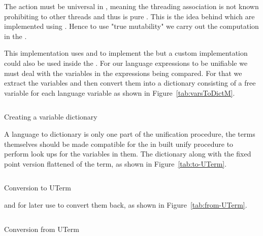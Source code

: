 \documentclass[thesis-solanki.tex]{subfiles}
\begin{document}
The action  must be universal in , meaning the threading association is not known
prohibiting to other threads and thus  is pure \cite{website:stmonadwiki,
  website:stmonadstackoverflow}.
This is the idea behind  which are implemented using .
Hence to use "true mutability" we carry out the computation in the .

This implementation uses  and  to implement the
 but a custom implementation could also be used inside the
.
For our language expressions to be unifiable we must deal with the variables in the expressions being compared.
For that we extract the variables and then convert them into a dictionary consisting of a free variable for each
language variable as shown in Figure~\ref{tab:varsToDictM}.

\begin{code-list}[H]
  \begin{singlespace}
  \inputminted[linenos]{haskell}{haskell-proto1-var-extract.hs}
  \end{singlespace}
  \caption{Creating a variable dictionary}
  \label{tab:varsToDictM}
\end{code-list}

A language to  dictionary is only one part of the unification procedure, the terms
themselves should be made compatible for the in built unify procedure to perform look ups for the variables in
them.
The dictionary along with the fixed point version flattened of the term, as shown in Figure~\ref{tab:to-UTerm}.
%
\begin{code-list}[H]
  \begin{singlespace}
  \inputminted[linenos]{haskell}{haskell-proto1-utermify-frog.hs}
  \end{singlespace}
  \caption{Conversion to UTerm}
  \label{tab:to-UTerm}
\end{code-list}
%
and for later use to convert them back, as shown in Figure~\ref{tab:from-UTerm}.
%
\begin{code-list}[H]
  \begin{singlespace}
    \inputminted[linenos]{haskell}{haskell-proto1-vtermify-goat.hs}
  \end{singlespace}
  \caption{Conversion from UTerm}
  \label{tab:from-UTerm}
\end{code-list}
\end{document}

